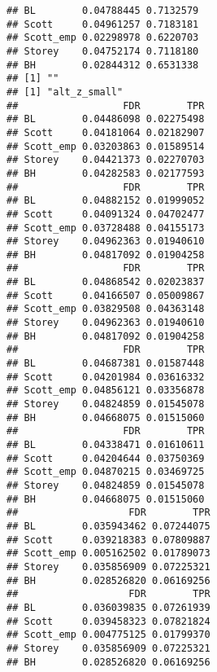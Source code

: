 \documentclass{article}\usepackage[]{graphicx}\usepackage[]{color}
\makeatletter
\newenvironment{kframe}{%
 \def\at@end@of@kframe{}%
 \ifinner\ifhmode%
  \def\at@end@of@kframe{\end{minipage}}%
  \begin{minipage}{\columnwidth}%
 \fi\fi%
 \def\FrameCommand##1{\hskip\@totalleftmargin \hskip-\fboxsep
 \colorbox{shadecolor}{##1}\hskip-\fboxsep
     \hskip-\linewidth \hskip-\@totalleftmargin \hskip\columnwidth}%
 \MakeFramed {\advance\hsize-\width
   \@totalleftmargin\z@ \linewidth\hsize
   \@setminipage}}%
 {\par\unskip\endMakeFramed%
 \at@end@of@kframe}
\newenvironment{knitrout}{}{} %
\makeatother
\begin{document}
\begin{knitrout}
\begin{kframe}
\begin{verbatim}
## BL        0.04788445 0.7132579
## Scott     0.04961257 0.7183181
## Scott_emp 0.02298978 0.6220703
## Storey    0.04752174 0.7118180
## BH        0.02844312 0.6531338
## [1] ""
## [1] "alt_z_small"
##                  FDR        TPR
## BL        0.04486098 0.02275498
## Scott     0.04181064 0.02182907
## Scott_emp 0.03203863 0.01589514
## Storey    0.04421373 0.02270703
## BH        0.04282583 0.02177593
##                  FDR        TPR
## BL        0.04882152 0.01999052
## Scott     0.04091324 0.04702477
## Scott_emp 0.03728488 0.04155173
## Storey    0.04962363 0.01940610
## BH        0.04817092 0.01904258
##                  FDR        TPR
## BL        0.04868542 0.02023837
## Scott     0.04166507 0.05009867
## Scott_emp 0.03829508 0.04363148
## Storey    0.04962363 0.01940610
## BH        0.04817092 0.01904258
##                  FDR        TPR
## BL        0.04687381 0.01587448
## Scott     0.04201984 0.03616332
## Scott_emp 0.04856121 0.03356878
## Storey    0.04824859 0.01545078
## BH        0.04668075 0.01515060
##                  FDR        TPR
## BL        0.04338471 0.01610611
## Scott     0.04204644 0.03750369
## Scott_emp 0.04870215 0.03469725
## Storey    0.04824859 0.01545078
## BH        0.04668075 0.01515060
##                   FDR        TPR
## BL        0.035943462 0.07244075
## Scott     0.039218383 0.07809887
## Scott_emp 0.005162502 0.01789073
## Storey    0.035856909 0.07225321
## BH        0.028526820 0.06169256
##                   FDR        TPR
## BL        0.036039835 0.07261939
## Scott     0.039458323 0.07821824
## Scott_emp 0.004775125 0.01799370
## Storey    0.035856909 0.07225321
## BH        0.028526820 0.06169256
\end{verbatim}
\end{kframe}
\end{knitrout}
\end{document}
